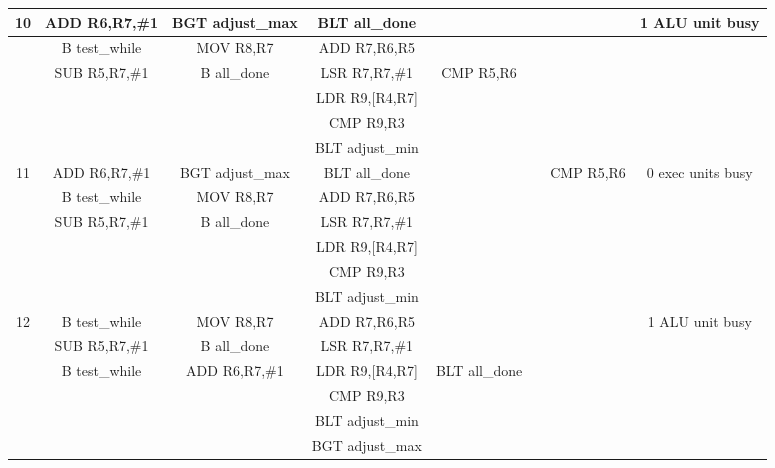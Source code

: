 \documentclass{article}
\begin{document}
{\begin{landscape}
\begin{longtable}{|c|c|c|c|c:c|c|c|}
    10 & ADD R6,R7,\#1 & BGT adjust\_max & BLT all\_done & & & & 1 ALU unit busy \\ \hline
     & B test\_while & MOV R8,R7 & ADD R7,R6,R5 & & & & \\ \hline
     & SUB R5,R7,\#1 & B all\_done & LSR R7,R7,\#1 & CMP R5,R6 &  & & \\ \hline
     &  &  & LDR R9,[R4,R7] & &  & & \\ \hline
     &  &  & CMP R9,R3 &  &  &  & \\ \hline
     &  &  & BLT adjust\_min &  &  &  & \\ \hline \hline
     
    11 & ADD R6,R7,\#1 & BGT adjust\_max & BLT all\_done & & & CMP R5,R6 & 0 exec units busy \\ \hline
     & B test\_while & MOV R8,R7 & ADD R7,R6,R5 & & & & \\ \hline
     & SUB R5,R7,\#1 & B all\_done & LSR R7,R7,\#1 & &  & & \\ \hline
     &  &  & LDR R9,[R4,R7] & &  & & \\ \hline
     &  &  & CMP R9,R3 &  &  &  & \\ \hline
     &  &  & BLT adjust\_min &  &  &  & \\ \hline \hline
     
    12 & B test\_while & MOV R8,R7 &ADD R7,R6,R5 & & & & 1 ALU unit busy \\ \hline
     & SUB R5,R7,\#1 & B all\_done & LSR R7,R7,\#1 & & & & \\ \hline
     & B test\_while & ADD R6,R7,\#1 & LDR R9,[R4,R7] & BLT all\_done &  & & \\ \hline
     &  &  & CMP R9,R3 & &  & & \\ \hline
     &  &  & BLT adjust\_min &  &  &  & \\ \hline
     &  &  & BGT adjust\_max &  &  &  & \\ \hline \hline
     

\end{longtable}
\end{landscape}}
\end{document}
